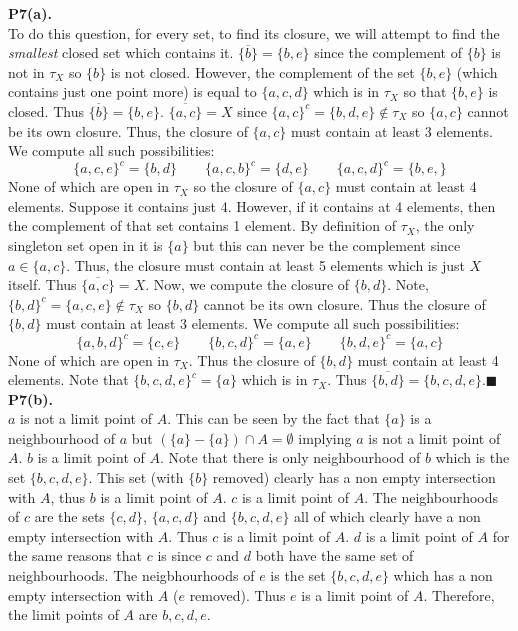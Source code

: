 \documentclass{article}
\begin{document}
    \textbf{P7(a).}\\
    To do this question, for every set, to find its closure, we will attempt to find the \textit{smallest} closed set which
    contains it. $\overline{\{b\}} = \{b,e\}$ since the complement of $\{b\}$ is not in $\tau_X$ so $\{b\}$ is not closed. However,
    the complement of the set $\{b,e\}$ (which contains just one point more) is equal to $\{a,c,d\}$ which is in $\tau_X$ so that
    $\{b,e\}$ is closed. Thus $\overline{\{b\}} = \{b,e\}$. $\overline{\{a,c\}} = X$ 
    since $\{a,c\}^{c} = \{b,d,e\}\not\in\tau_X$ so $\{a,c\}$
    cannot be its own closure. Thus, the closure of $\{a,c\}$ must contain at least 3 elements. We compute all such possibilities:
    \[ \{a,c,e\}^{c} = \{b,d\}\qquad \{a,c,b\}^{c} = \{d,e\}\qquad \{a,c,d\}^{c} = \{b,e,\} \]
    None of which are open in $\tau_X$ so the closure of $\{a,c\}$ must contain at least 4 elements. Suppose it contains just 4. 
    However, if it contains at 4 elements, then the complement of that set contains 1 element. By definition of $\tau_X$, the only
    singleton set open in it is $\{a\}$ but this can never be the complement since $a\in \{a,c\}$. Thus, the closure must contain
    at least 5 elements which is just $X$ itself. Thus $\overline{\{a,c\}} = X$. Now, we compute the closure of $\{b,d\}$. Note,
    $\{b,d\}^{c} = \{a,c,e\}\not\in\tau_X$ so $\{b,d\}$ cannot be its own closure. Thus the closure of $\{b,d\}$ must contain
    at least 3 elements. We compute all such possibilities:
    \[ \{a,b,d\}^{c} = \{c,e\}\qquad \{b,c,d\}^{c} = \{a,e\}\qquad \{b,d,e\}^{c} = \{a,c\} \]
    None of which are open in $\tau_X$. Thus the closure of $\{b,d\}$ must contain at least 4 elements. Note that $\{b,c,d,e\}^{c}
    = \{a\}$ which is in $\tau_X$. Thus $\overline{\{b,d\}} = \{b,c,d,e\}$.\hfill$\blacksquare$\\

    \textbf{P7(b).}\\
    $a$ is not a limit point of $A$. This can be seen by the fact that $\{a\}$ is a neighbourhood of $a$ but $(\{a\}-\{a\})\cap A=
    \emptyset$ implying $a$ is not a limit point of $A$. $b$ is a limit point of $A$. Note that there is only neighbourhood
    of $b$ which is the set $\{b,c,d,e\}$. This set (with $\{b\}$ removed) clearly has a non empty intersection with $A$, thus
    $b$ is a limit point of $A$. $c$ is a limit point of $A$. The neighbourhoods of $c$ are the sets $\{c,d\}$, $\{a,c,d\}$ and
    $\{b,c,d,e\}$ all of which clearly have a non empty intersection with $A$. Thus $c$ is a limit point of $A$. $d$ is a limit
    point of $A$ for the same reasons that $c$ is since $c$ and $d$ both have the same set of neighbourhoods. The neigbhourhoods
    of $e$ is the set $\{b,c,d,e\}$ which has a non empty intersection with $A$ ($e$ removed). Thus $e$ is a limit point of $A$.
    Therefore, the limit points of $A$ are $b,c,d,e$.\\
\end{document}
